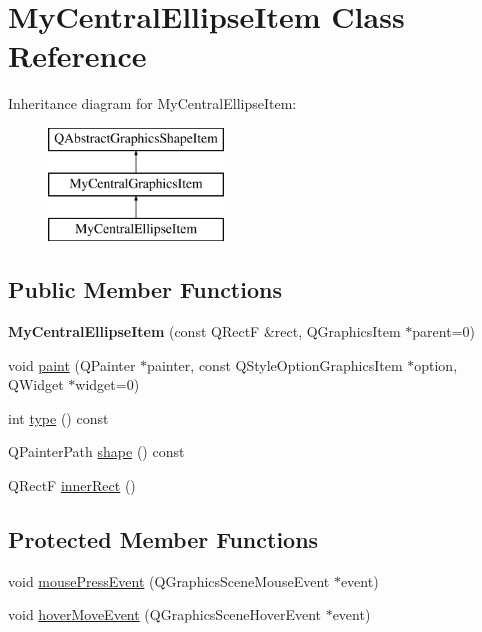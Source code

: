 \hypertarget{class_my_central_ellipse_item}{}\section{My\+Central\+Ellipse\+Item Class Reference}
\label{class_my_central_ellipse_item}
Inheritance diagram for My\+Central\+Ellipse\+Item\+:\begin{figure}[H]
\begin{center}
\leavevmode
\includegraphics[height=3.000000cm]{class_my_central_ellipse_item}
\end{center}
\end{figure}
\subsection*{Public Member Functions}
\begin{DoxyCompactItemize}
\item 
\hypertarget{class_my_central_ellipse_item_ac912023a16f5f6e6331b1fe861ca42d2}{}{\bfseries My\+Central\+Ellipse\+Item} (const Q\+Rect\+F \&rect, Q\+Graphics\+Item $\ast$parent=0)\label{class_my_central_ellipse_item_ac912023a16f5f6e6331b1fe861ca42d2}

\item 
void \hyperlink{class_my_central_ellipse_item_aa3ae037258cf9839002f8da7e83c3239}{paint} (Q\+Painter $\ast$painter, const Q\+Style\+Option\+Graphics\+Item $\ast$option, Q\+Widget $\ast$widget=0)
\item 
int \hyperlink{class_my_central_ellipse_item_a94c23343867dce46a608582dfe01fffb}{type} () const 
\item 
Q\+Painter\+Path \hyperlink{class_my_central_ellipse_item_a075835bf21a3d95317ece40e9ca3da7c}{shape} () const 
\item 
Q\+Rect\+F \hyperlink{class_my_central_ellipse_item_a97f879a0bb7cfa7270f33c3d77d5b7a0}{inner\+Rect} ()
\end{DoxyCompactItemize}
\subsection*{Protected Member Functions}
\begin{DoxyCompactItemize}
\item 
void \hyperlink{class_my_central_ellipse_item_ab1b7f9aec994268061b5a38d2cd5744d}{mouse\+Press\+Event} (Q\+Graphics\+Scene\+Mouse\+Event $\ast$event)
\item 
void \hyperlink{class_my_central_ellipse_item_a0d465a1d4c907bda9d57b3a3207097a9}{hover\+Move\+Event} (Q\+Graphics\+Scene\+Hover\+Event $\ast$event)
\end{DoxyCompactItemize}
